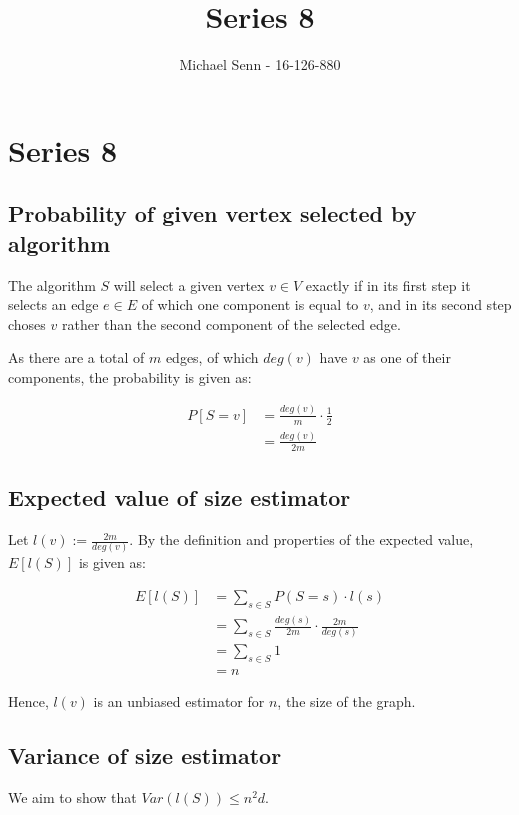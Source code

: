 \documentclass[a4paper]{scrreprt}
\title{Series 8}
\author{Michael Senn \maillink{michael.senn@students.unibe.ch} - 16-126-880}
\date{\printdate}
\begin{document}
\maketitle


\setcounter{chapter}{7}
\chapter{Series 8}

\section{Probability of given vertex selected by algorithm}

The algorithm $S$ will select a given vertex $v \in V$ exactly if in its first
step it selects an edge $e \in E$ of which one component is equal to $v$, and
in its second step choses $v$ rather than the second component of the selected
edge.

As there are a total of $m$ edges, of which $deg(v)$ have $v$ as one of their 
components, the probability is given as:

\begin{align*}
	P[S = v] & = \frac{deg(v)}{m} \cdot \frac{1}{2} \\
		 & = \frac{deg(v)}{2m}
\end{align*}

\section{Expected value of size estimator}

Let $l(v) := \frac{2m}{deg(v)}$. By the definition and properties of the
expected value, $E[l(S)]$ is given as:

\begin{align*}
	E[l(S)] & = \sum_{s \in S}{P(S = s) \cdot l(s)} \\
		& = \sum_{s \in S}{\frac{deg(s)}{2m} \cdot \frac{2m}{deg(s)}} \\
		& = \sum_{s \in S}{1} \\
		& = n
\end{align*}

Hence, $l(v)$ is an unbiased estimator for $n$, the size of the graph.

\section{Variance of size estimator}

We aim to show that $Var(l(S)) \leq n^2d$.
\end{document}

